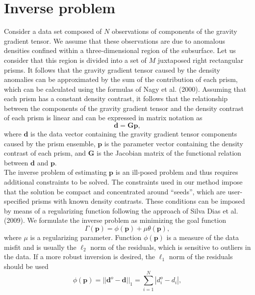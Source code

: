 \documentclass{segabs}
\begin{document}
\vspace{-0.4cm}
\section{Inverse problem}

Consider a data set composed of $N$ observations of components of the gravity gradient tensor.
We assume that these observations are due to anomalous densities confined within a
three-dimensional region of the subsurface. Let us consider that this region is divided
into a set of $M$
juxtaposed right rectangular prisms. It follows that the gravity gradient tensor caused
by the density anomalies can be approximated by the sum of the contribution of each
prism, which can be calculated using the formulas of Nagy et al. (2000).
Assuming that each prism has a constant density contrast, it follows that the relationship
between the components of the gravity gradient tensor and the density contrast of
each prism is linear and can be expressed in matrix notation as
\begin{equation}
\mathbf{d} = \mathbf{G}\mathbf{p},
\label{eq:forward}
\end{equation}
where $\mathbf{d}$ is the data vector containing the gravity gradient tensor
components caused by the prism ensemble, $\mathbf{p}$ is the parameter vector
containing the density contrast of each prism, and $\mathbf{G}$ is the Jacobian matrix
of the functional relation between $\mathbf{d}$ and $\mathbf{p}$.
\\[0.2cm]
The inverse problem of estimating $\mathbf{p}$ is an ill-posed problem and thus requires
additional constraints to be solved. The constraints used in our method impose that the solution be
compact and concentrated around ``seeds'', which are user-specified prisms with known density
contrasts. These conditions can be imposed by means of a regularizing function following the
approach of Silva Dias et al. (2009). We formulate the inverse problem as minimizing
the goal function
\begin{equation}
\Gamma(\mathbf{p}) = \phi(\mathbf{p}) + \mu \theta(\mathbf{p}),
\label{eq:goal}
\end{equation}
where $\mu$ is a regularizing parameter. Function $\phi(\mathbf{p})$ is a measure of
the data misfit and is usually the $\ell_2$ norm of the residuals, which is sensitive to
outliers in the data. If a more robust inversion is desired, the $\ell_1$ norm of the
residuals should be used
\begin{equation}
\phi(\mathbf{p}) = ||\mathbf{d}^{o} - \mathbf{d}||_1 =
\sum\limits_{i=1}^{N} |d^{o}_i - d_i|,
\label{eq:misfit}
\end{equation}
\end{document}
